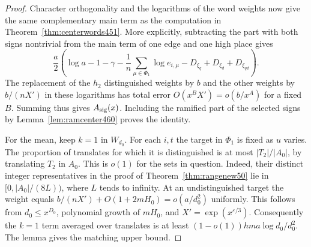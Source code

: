\documentclass[a4paper,11pt]{article}
\theoremstyle{definition}
\theoremstyle{remark}
\numberwithin{equation}{section}
\begin{document}
\begin{proof}
Character orthogonality and the logarithms of the word weights
now give the same complementary main term as the computation
in Theorem~\ref{thm:centerwords451}. More explicitly, subtracting
the part with both signs nontrivial from the main term of one
edge and one high place gives
\[
 \frac{a}{2}\left(\log a-1-\gamma
     -\frac1n\sum_{\mu\in\Phi_1}\log e_{i,\mu}
     -D_{\xi_q}+D_{\xi_d}+D_{\xi_{qd}}\right).
\]
The replacement of the \(h_2\) distinguished weights by \(b\)
and the other weights by \(b/(nX')\) in these logarithms has
total error \(O(x^B X')=o(b/x^A)\) for a fixed \(B\).
Summing thus gives \(A_{\rm sig}(x)\). Including the ramified
part of the selected signs by Lemma~\ref{lem:ramcenter460}
proves the identity.

For the mean, keep \(k=1\) in \(W_{d_0}\). For each \(i,t\) the
target in \(\Phi_1\) is fixed as \(u\) varies. The proportion
of translates for which it is distinguished is at most
\(|T_2|/|A_0|\), by translating \(T_2\) in \(A_0\). This is
\(o(1)\) for the sets in question. Indeed, their distinct
integer representatives in the proof of
Theorem~\ref{thm:rangenew50} lie in
\([0,|A_0|/(8L))\), where \(L\) tends to infinity. At an
undistinguished target the weight equals
\(b/(nX')+O(1+2mH_0)=o(a/d_0^2)\) uniformly. This follows
from \(d_0\le x^{D_0}\), polynomial growth of \(mH_0\), and
\(X'=\exp(x^{\varepsilon/3})\). Consequently the \(k=1\)
term averaged over translates is at least
\((1-o(1))hma\log d_0/d_0^2\). The lemma gives the matching
upper bound.
\end{proof}
\end{document}
